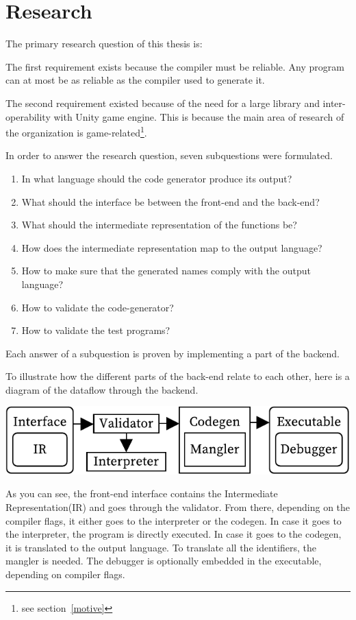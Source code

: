 \section{Research}\label{research}

The primary research question of this thesis is:



The first requirement exists because the compiler must be reliable.
Any program can at most be as reliable as the compiler used to generate it.

\label{whydotnet}
The second requirement existed because of the need for a large library and inter-operability with Unity game engine.
This is because the main area of research of the organization is game-related\footnote{see section~\ref{motive}}.

In order to answer the research question, seven subquestions were formulated.

\begin{enumerate}
    \item In what language should the code generator produce its output?
    \item What should the interface be between the front-end and the back-end?
    \item What should the intermediate representation of the functions be?
    \item How does the intermediate representation map to the output language?
    \item How to make sure that the generated names comply with the output language?
    \item How to validate the code-generator?
    \item How to validate the test programs?
\end{enumerate}

Each answer of a subquestion is proven by implementing a part of the backend. 

To illustrate how the different parts of the back-end relate to each other, here is a diagram of the dataflow through the backend.

\includegraphics[width=\columnwidth]{overview}

As you can see, the front-end interface contains the Intermediate Representation(IR) and goes through the validator.
From there, depending on the compiler flags, it either goes to the interpreter or the codegen.
In case it goes to the interpreter, the program is directly executed.
In case it goes to the codegen, it is translated to the output language.
To translate all the identifiers, the mangler is needed.
The debugger is optionally embedded in the executable, depending on compiler flags.

